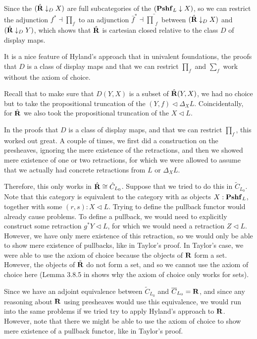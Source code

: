 \begin{corollary}
  Since the $ (\hat {\mathbf{R}} \downarrow_D X) $ are full subcategories of the $ (\mathbf{Pshf}_{L} \downarrow X) $, so we can restrict the adjunction $ f^* \dashv \prod_f $ to an adjunction $ \bar f^* \dashv \bar \prod_f $ between $ (\hat {\mathbf{R}} \downarrow_D X) $ and $ (\hat {\mathbf{R}} \downarrow_D Y) $, which shows that $ \hat {\mathbf{R}} $ is cartesian closed relative to the class $ D $ of display maps.
\end{corollary}

\begin{remark}
  It is a nice feature of Hyland's approach that in univalent foundations, the proofs that $ D $ is a class of display maps and that we can restrict $ \prod_f $ and $ \sum_f $ work without the axiom of choice.
\end{remark}

\begin{remark}
  Recall that to make sure that $ D(Y, X) $ is a subset of $ \hat {\mathbf{R}}(Y, X) $, we had no choice but to take the propositional truncation of the $ (Y, f) \triangleleft \Delta_X L $. Coincidentally, for $ \hat {\mathbf{R}} $ we also took the propositional truncation of the $ X \triangleleft L $.

  In the proofs that $ D $ is a class of display maps, and that we can restrict $ \prod_f $, this worked out great. A couple of times, we first did a construction on the presheaves, ignoring the mere existence of the retractions, and then we showed mere existence of one or two retractions, for which we were allowed to assume that we actually had concrete retractions from $ L $ or $ \Delta_X L $.

  Therefore, this only works in $ \hat {\mathbf{R}} \cong \hat C_{L_0} $. Suppose that we tried to do this in $ \tilde C_{L_0} $. Note that this category is equivalent to the category with as objects $ X : \mathbf{Pshf}_{L} $, together with some $ (r, s) : X \triangleleft L $. Trying to define the pullback functor would already cause problems. To define a pullback, we would need to explicitly construct some retraction $ g^* Y \triangleleft L $, for which we would need a retraction $ Z \triangleleft L $. However, we have only mere existence of this retraction, so we would only be able to show mere existence of pullbacks, like in Taylor's proof. In Taylor's case, we were able to use the axiom of choice because the objects of $ \mathbf{R} $ form a set. However, the objects of $ \tilde {\mathbf{R}} $ do not form a set, and so we cannot use the axiom of choice here (Lemma 3.8.5 in \autocite{hottbook} shows why the axiom of choice only works for sets).

  Since we have an adjoint equivalence between $ \tilde C_{L_0} $ and $ \overline C_{L_0} = \mathbf{R} $, and since any reasoning about $ \mathbf{R} $ using presheaves would use this equivalence, we would run into the same problems if we tried try to apply Hyland's approach to $ \mathbf{R} $. However, note that there we might be able to use the axiom of choice to show mere existence of a pullback functor, like in Taylor's proof.
\end{remark}

